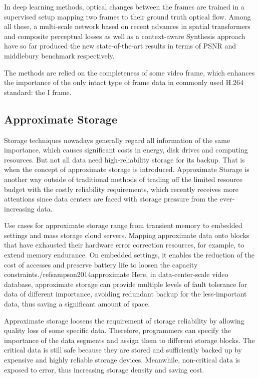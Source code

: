 \documentclass[sigconf]{acmart}
\begin{document}
In deep learning methods, optical changes between the frames are trained in a supervised setup mapping two frames to their ground truth optical flow. Among all these, a multi-scale network\cite{van2017frame} based on recent advances in spatial transformers and composite perceptual losses as well as a context-aware Synthesis approach\cite{niklaus2018context} have so far produced the new state-of-the-art results in terms of PSNR and middlebury benchmark respectively.


The methods are relied on the completeness of some video frame, which enhances the importance of the only intact type of frame data in commonly used H.264 standard: the I frame.


\subsection{Approximate Storage}
Storage techniques nowadays generally regard all information of the same importance, which causes significant costs in energy, disk drives and computing resources. But not all data need high-reliability storage for its backup. That is when the concept of approximate storage is introduced. Approximate Storage is another way outside of traditional methods of trading off the limited resource budget with the costly reliability requirements, which recently receives more attentions since data centers are faced with storage pressure from the ever-increasing data.

Use cases for approximate storage range from transient memory to embedded settings and mass storage cloud servers. Mapping approximate data onto blocks that have exhausted their hardware error correction resources, for example, to extend memory endurance. On embedded settings, it enables the reduction of the cost of accesses and preserve battery life to loosen the capacity constraints./ref{sampson2014approximate} Here, in data-center-scale video database, approximate storage can provide multiple levels of fault tolerance for data of different importance, avoiding redundant backup for the less-important data, thus saving a significant amount of space.


Approximate storage loosens the requirement of storage reliability by allowing quality loss of some specific data. Therefore, programmers can specify the importance of the data segments and assign them to different storage blocks. The critical data is still safe because they are stored and sufficiently backed up by expensive and highly reliable storage devices. Meanwhile, non-critical data is exposed to error, thus increasing storage density and saving cost.
\end{document}
